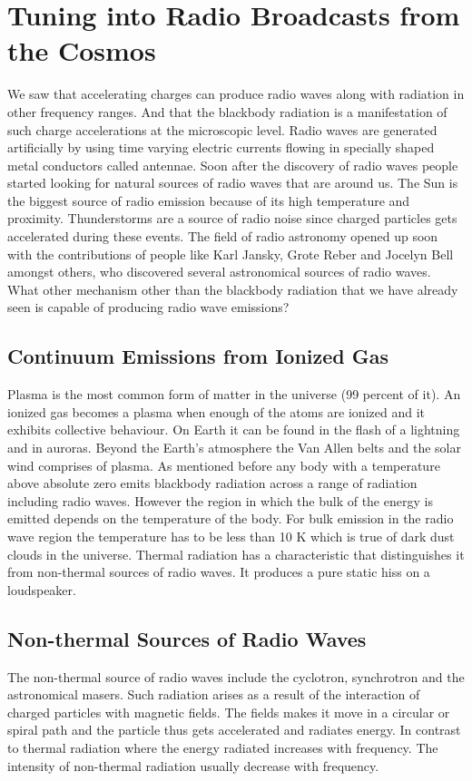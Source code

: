 \documentclass{../template/texnote}
\begin{document}
\section{Tuning into Radio Broadcasts from the Cosmos}
We saw that accelerating charges can produce radio waves along with radiation in other frequency ranges. And that the blackbody radiation is a manifestation of such charge accelerations at the microscopic level. 
Radio waves are generated artificially by using time varying electric currents flowing in specially shaped metal conductors called antennae.  
Soon after the discovery of radio waves people started looking for natural sources of radio waves that are around us. The Sun is the biggest source of radio emission because of its high temperature and proximity. Thunderstorms are a source of radio noise since charged particles gets accelerated during these events. The field of radio astronomy opened up soon with the contributions of people like Karl Jansky, Grote Reber and Jocelyn Bell amongst others, who discovered several astronomical sources of radio waves. 
What other mechanism other than the blackbody radiation that we have already seen is capable of producing radio wave emissions?

\subsection{Continuum Emissions from Ionized Gas}
Plasma is the most common form of matter in the universe (99 percent of it). An ionized gas becomes a plasma when enough of the atoms are ionized and it exhibits collective behaviour. On Earth it can be found in the flash of a lightning and in auroras. Beyond the Earth’s atmosphere the Van Allen belts and the solar wind comprises of plasma. 
As mentioned before any body with a temperature above absolute zero emits blackbody radiation across a range of radiation including radio waves. However the region in which the bulk of the energy is emitted depends on the temperature of the body. For bulk emission in the radio wave region the temperature has to be less than 10 K which is true of dark dust clouds in the universe.
Thermal radiation has a characteristic that distinguishes it from non-thermal sources of radio waves. It produces a pure static hiss on a loudspeaker. 

\subsection{Non-thermal Sources of Radio Waves}
The non-thermal source of radio waves include the cyclotron, synchrotron and the astronomical masers. Such radiation arises as a result of the interaction of charged particles with magnetic fields. The fields makes it move in a circular or spiral path and the particle thus gets accelerated and radiates energy.
In contrast to thermal radiation  where the energy radiated increases with frequency. The intensity of non-thermal radiation usually decrease with frequency.
\end{document}
